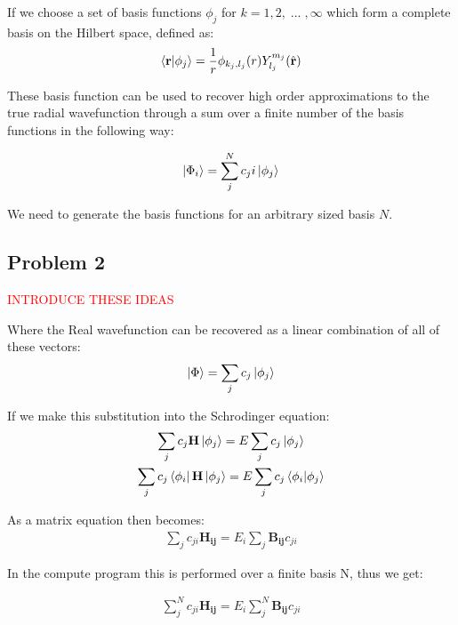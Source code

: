 \documentclass{article}
\renewcommand{\vec}[1]{\mathbf{#1}}
\let\oldhat\hat
\renewcommand{\hat}[1]{\oldhat{\mathbf{#1}}}
\begin{document}
    If we choose a set of basis functions $\phi_{j}$ for $k={1,2,\; ...\;, \infty}$ which form a complete basis on the Hilbert space, defined as:
    \large
    \begin{gather}
    	\braket{\vec{r}}{\phi_j} = \frac{1}{r}\phi_{k_j,l_j}(r)Y^{m_j}_{l_j}(\hat{\vec{r}})
    \end{gather}
    \normalsize
    
    These basis function can be used to recover high order approximations to the true radial wavefunction through a sum over a finite number of the basis functions in the following way:
   
    \large
    \begin{gather}
    	\ket{\Phi_i} = \sum_{j}^{N} c_ji \ket{\phi_j}
    \end{gather}
    \normalsize
    
    We need to generate the basis functions for an arbitrary sized basis $N$.
    
    
    
    \subsection{Problem 2}
    
    \textcolor{red}{INTRODUCE THESE IDEAS}
    
    Where the Real wavefunction can be recovered as a linear combination of all of these vectors:
    \large
    \begin{gather}
    	\ket{\Phi} = \sum_{j}c_j\ket{\phi_j}
    \end{gather}
    \normalsize
    
    If we make this substitution into the Schrodinger equation:
    \large
    \begin{gather}
    	\sum_{j}c_j\vec{H}\ket{\phi_j} = E\sum_{j}c_j\ket{\phi_j}\\
    	\sum_{j}c_j\bra{\phi_i}\vec{H}\ket{\phi_j} = E\sum_{j}c_j\bra{\phi_i}\ket{\phi_j}
    \end{gather}
    \normalsize
    
    As a matrix equation then becomes:
    \large
    \begin{gather}
    	\sum_{j}c_{ji}\vec{H_{ij}} = E_i\sum_{j}\vec{B_{ij}}c_{ji}
    \end{gather}
    \normalsize


    In the compute program this is performed over a finite basis N, thus we get:
    
	\large
	\begin{gather}
		\sum_{j}^{N}c_{ji}\vec{H_{ij}} = E_i\sum_{j}^{N}\vec{B_{ij}}c_{ji}
	\end{gather}
	\normalsize
 		
	
\end{document}
